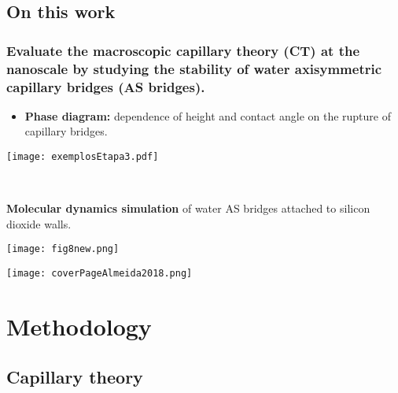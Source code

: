 \documentclass[8pt]{beamer}
\begin{document}
\subsection{On this work}
\begin{frame}
\frametitle{Evaluate the macroscopic capillary theory (CT) at the nanoscale by studying the stability of water axisymmetric capillary bridges (AS bridges).}
   		\begin{minipage}{0.48\textwidth}
   			\begin{itemize}
   			    \item \small \textbf{Phase diagram:} dependence of height and contact angle on the rupture of capillary bridges.
   			\end{itemize}
		\begin{center}
	          \texttt{[image: exemplosEtapa3.pdf]}   			
		\end{center}
		\vspace{0.75cm}
   		\end{minipage}   		   				
   		~
   		\begin{minipage}{0.48\textwidth}
        {\small{\textbf{Molecular dynamics simulation} of water AS bridges attached to silicon dioxide walls.}}
			\begin{center}
				\texttt{[image: fig8new.png]}\\
			\end{center}
   		\end{minipage}   		
        \vspace{0.5cm}   		
		\begin{center}
			\texttt{[image: coverPageAlmeida2018.png]}
		\end{center}
   		
\end{frame}


\section{Methodology}
\subsection{Capillary theory}
\end{document}
